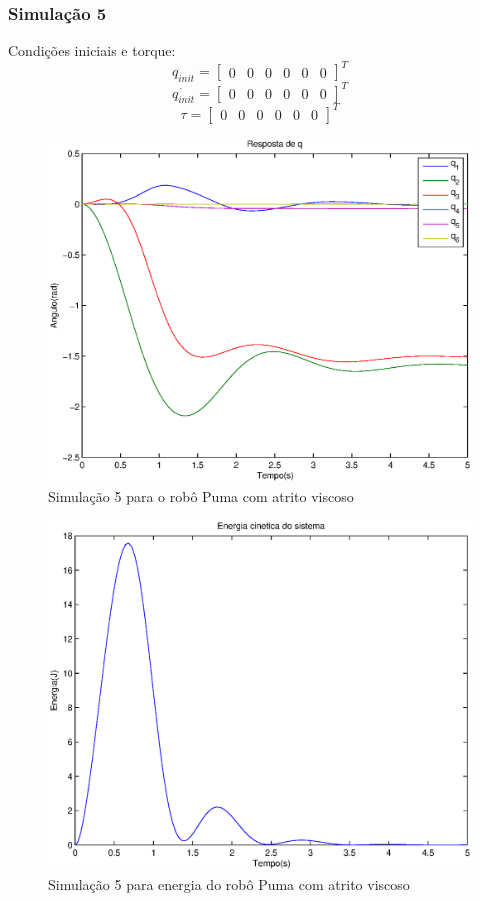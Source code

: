 \documentclass{article}
\begin{document}
\subsubsection{Simulação 5}
Condições iniciais e torque:
\begin{equation}
\label{eq:sim5q}
q_{init}=\begin{bmatrix}
0 & 0 & 0 & 0 & 0 & 0
\end{bmatrix}^T
\end{equation}
\begin{equation}
\label{eq:sim5qd}
\dot{q_{init}}=\begin{bmatrix}
0 & 0 & 0 & 0 & 0 & 0
\end{bmatrix}^T
\end{equation}
\begin{equation}
\label{eq:sim5tau}
\tau=\begin{bmatrix}
0 & 0 & 0 & 0 & 0 & 0
\end{bmatrix}^T
\end{equation}

\begin{figure}[H]
	\centering
	\includegraphics[width=0.8\linewidth]{../sime1odea}
	\caption{Simulação 5 para o robô Puma com atrito viscoso}
	\label{fig:pumasim5}
\end{figure}

\begin{figure}[H]
	\centering
	\includegraphics[width=0.8\linewidth]{../sime1kina}
	\caption{Simulação 5 para energia do robô Puma com atrito viscoso}
	\label{fig:energysim5}
\end{figure}
\end{document}
